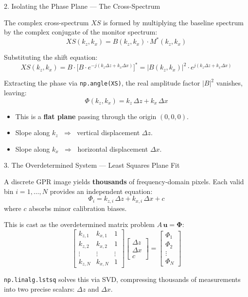 \documentclass{beamer}
\begin{document}
\begin{frame}{2. Isolating the Phase Plane — The Cross-Spectrum}

The complex cross-spectrum $XS$ is formed by multiplying the baseline spectrum
by the complex conjugate of the monitor spectrum:
\[
  XS(k_z, k_x) = B(k_z, k_x) \cdot M^{*}(k_z, k_x)
\]

Substituting the shift equation:
\[
  XS(k_z, k_x)
  = B \cdot \bigl[B \cdot e^{-j(k_z \Delta z + k_x \Delta x)}\bigr]^{*}
  = |B(k_z, k_x)|^{2} \cdot e^{j(k_z \Delta z + k_x \Delta x)}
\]

Extracting the phase via \texttt{np.angle(XS)}, the real amplitude factor
$|B|^2$ vanishes, leaving:
\[
  \boxed{\Phi(k_z, k_x) = k_z\,\Delta z + k_x\,\Delta x}
\]

\begin{itemize}
  \item This is a \textbf{flat plane} passing through the origin $(0,0,0)$.
  \item Slope along $k_z$ $\;\Rightarrow\;$ vertical displacement $\Delta z$.
  \item Slope along $k_x$ $\;\Rightarrow\;$ horizontal displacement $\Delta x$.
\end{itemize}

\end{frame}

\begin{frame}{3. The Overdetermined System — Least Squares Plane Fit}

A discrete GPR image yields \textbf{thousands} of frequency-domain pixels.
Each valid bin $i = 1, \dots, N$ provides an independent equation:
\[
  \Phi_i = k_{z,i}\,\Delta z + k_{x,i}\,\Delta x + c
\]
where $c$ absorbs minor calibration biases.

\bigskip
This is cast as the overdetermined matrix problem $A\,\mathbf{u} = \bm{\Phi}$:
\[
  \begin{bmatrix}
    k_{z,1} & k_{x,1} & 1 \\
    k_{z,2} & k_{x,2} & 1 \\
    \vdots  & \vdots  & \vdots \\
    k_{z,N} & k_{x,N} & 1
  \end{bmatrix}
  \begin{bmatrix} \Delta z \\ \Delta x \\ c \end{bmatrix}
  =
  \begin{bmatrix} \Phi_1 \\ \Phi_2 \\ \vdots \\ \Phi_N \end{bmatrix}
\]

\medskip
\texttt{np.linalg.lstsq} solves this via SVD, compressing thousands of
measurements into two precise scalars: $\Delta z$ and $\Delta x$.

\end{frame}
\end{document}
